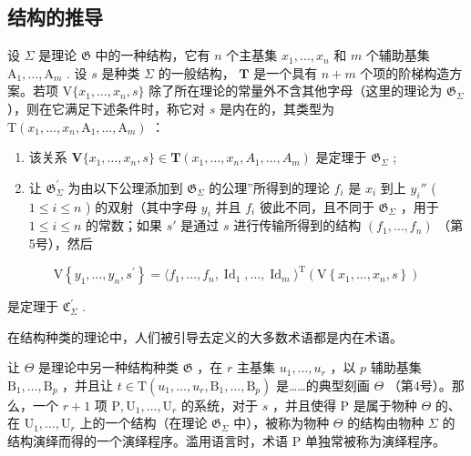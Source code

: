 \subsection{结构的推导}

设 \(\Sigma\) 是理论 \(\mathfrak{G}\) 中的一种结构，它有 \(n\) 个主基集 \(x_{1},\ldots ,x_{n}\) 和 \(m\) 个辅助基集 \(\mathrm{A}_1,\dots ,\mathrm{A}_m\) . 设 \(s\) 是种类 \(\Sigma\) 的一般结构， \(\mathbf{T}\) 是一个具有 \(n + m\) 个项的阶梯构造方案。若项 \(\mathrm{V}\{x_1,\dots,x_n,s\}\) 除了所在理论的常量外不含其他字母（这里的理论为 \(\mathfrak{G}_{\Sigma}\) ），则在它满足下述条件时，称它对 \(s\) 是内在的，其类型为 \(\mathrm{T}(x_1,\dots,x_n,\mathrm{A}_1,\dots,\mathrm{A}_m)\) ：

\begin{enumerate}
\def\labelenumi{(\arabic{enumi})}
\item
  该关系 \(\mathbf{V}\{x_1, \ldots, x_n, s\} \in \mathbf{T}(x_1, \ldots, x_n, A_1, \ldots, A_m)\) 是定理于 \(\mathfrak{G}_{\Sigma}\) ;
\item
  让 \(\mathfrak{G}_{\Sigma}^{\prime}\) 为由以下公理添加到 \(\mathfrak{G}_{\Sigma}\) 的公理''所得到的理论 \(f_{i}\) 是 \(x_{i}\) 到上 \(y_{i}''\) ( \(1 \leqslant i \leqslant n\) ) 的双射（其中字母 \(y_{i}\) 并且 \(f_{i}\) 彼此不同，且不同于 \(\mathfrak{G}_{\Sigma}\) ，用于 \(1 \leqslant i \leqslant n\) 的常数；如果 \(s'\) 是通过 \(s\) 进行传输所得到的结构 \((f_{1}, \ldots, f_{n})\) （第5号），然后
\end{enumerate}

\[
\mathrm{V} \left\{y _ {1}, \dots , y _ {n}, s ^ {\prime} \right\} = \langle f _ {1}, \dots , f _ {n}, \operatorname{Id} _ {1}, \dots , \operatorname{Id} _ {m} \rangle^ {\mathrm{T}} (\mathrm{V} \left\{x _ {1}, \dots , x _ {n}, s \right\})
\]

是定理于 \(\mathfrak{C}_{\Sigma}^{\prime}\) .

在结构种类的理论中，人们被引导去定义的大多数术语都是内在术语。

让 \(\Theta\) 是理论中另一种结构种类 \(\mathfrak{G}\) ，在 \(r\) 主基集 \(u_{1},\ldots,u_{r}\) ，以 \(p\) 辅助基集 \(\mathrm{B}_{1},\ldots,\mathrm{B}_{p}\) ，并且让 \(t\in\mathrm{T}(u_{1},\ldots,u_{r},\mathrm{B}_{1},\ldots,\mathrm{B}_{p})\) 是……的典型刻画 \(\Theta\) （第4号）。那么，一个 \(r+1\) 项 \(\mathrm{P},\mathrm{U}_{1},\ldots,\mathrm{U}_{r}\) 的系统，对于 \(s\) ，并且使得 \(\mathrm{P}\) 是属于物种 \(\Theta\) 的、在 \(\mathrm{U}_{1},\ldots,\mathrm{U}_{r}\) 上的一个结构（在理论 \(\mathfrak{G}_{\Sigma}\) 中），被称为物种 \(\Theta\) 的结构由物种 \(\Sigma\) 的结构演绎而得的一个演绎程序。滥用语言时，术语 \(\mathrm{P}\) 单独常被称为演绎程序。


